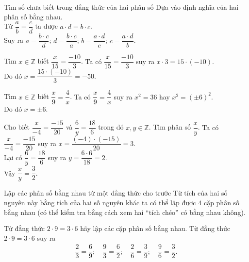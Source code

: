 \begin{dang}{Tìm số chưa biết trong đẳng thức của hai phân số}
 Dựa vào định nghĩa của hai phân số bằng nhau.\\
 Từ $\dfrac{a}{b}=\dfrac{c}{d}$ ta được $a\cdot d = b\cdot c$.\\
 Suy ra $a=\dfrac{b\cdot c}{d}$; $d=\dfrac{b\cdot c}{a}$; $b=\dfrac{a\cdot d}{c}$; $c=\dfrac{a\cdot d}{b}$.
\end{dang}

\begin{vd}%
 Tìm $x\in\mathbb{Z}$ biết $\dfrac{x}{15}=\dfrac{-10}{3}$.
 \loigiai
  {
  Ta có $\dfrac{x}{15}=\dfrac{-10}{3}$ suy ra $x \cdot 3 =15\cdot(-10)$.\\
  Do đó $x=\dfrac{15\cdot(-10)}{3}=-50$.
  }
\end{vd}

\begin{vd}%
 Tìm $x\in\mathbb{Z}$ biết $\dfrac{x}{9}=\dfrac{4}{x}$.
 \loigiai
  {
  Ta có $\dfrac{x}{9}=\dfrac{4}{x}$ suy ra $x^2 =36$ hay $x^2=(\pm 6)^2$.\\
  Do đó $x=\pm 6$.
  }
\end{vd}

\begin{vd}%
 Cho biết $\dfrac{x}{-4}=\dfrac{-15}{20}$ và $\dfrac{6}{y}=\dfrac{18}{6}$ trong đó $x,y\in\mathbb{Z}$. Tìm phân số $\dfrac{x}{y}$.
 \loigiai
  {
  Ta có $\dfrac{x}{-4}=\dfrac{-15}{20}$ suy ra $x=\dfrac{(-4)\cdot(-15)}{20}=3$.\\
  Lại có $\dfrac{6}{y}=\dfrac{18}{6}$ suy ra $y=\dfrac{6\cdot6}{18}=2$.\\
  Vậy $\dfrac{x}{y}=\dfrac{3}{2}$.
  }
\end{vd}

\begin{dang}{Lập các phân số bằng nhau từ một đẳng thức cho trước}
 Từ tích của hai số nguyên này bằng tích của hai số nguyên khác ta có thể lập được $4$ cặp phân số bằng nhau (có thể kiểm tra bằng cách xem hai ``tích chéo'' có bằng nhau không).
\end{dang}

\begin{vd}%
 Từ đẳng thức $2\cdot9 = 3\cdot6$ hãy lập các cặp phân số bằng nhau.
 \loigiai
  {
  Từ đẳng thức $2\cdot9 = 3\cdot6$ suy ra
  \begin{eqnarray*}
   \dfrac{2}{3}=\dfrac{6}{9};\quad \dfrac{9}{3}=\dfrac{6}{2};\quad \dfrac{2}{6}=\dfrac{3}{9};\quad \dfrac{9}{6}=\dfrac{3}{2}.
  \end{eqnarray*}
  }
\end{vd}

